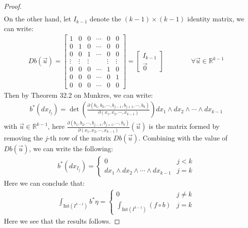 \documentclass[11pt,oneside]{book}
\theoremstyle{break}
\theoremstyle{break}
\newcommand{\R}{\mathbb{R}}
\newcommand{\Int}{\text{Int}}
\newcommand{\bmat}[1]{\begin{bmatrix} #1 \end{bmatrix}}
\begin{document}
\begin{proof}
\begin{align*}
\end{align*}
On the other hand, let $I_{k-1}$ denote the $(k-1)\times (k-1)$ identity matrix, we can write:
\begin{align*}
Db(\vec{u}) =\bmat{1&0&0 & \cdots & 0& 0\\
0&1&0 & \cdots & 0& 0\\
0&0&1 & \cdots & 0& 0\\
\vdots&\vdots&\vdots & & \vdots& \vdots\\
0&0&0 & \cdots & 1& 0\\
0&0&0 & \cdots & 0& 1\\
0&0&0 & \cdots & 0& 0}= \bmat{I_{k-1} \\ \vec{0}} \qquad\qquad \forall \vec{u}\in \R^{k-1}
\end{align*}
Then by Theorem 32.2 on Munkres, we can write:
\begin{align*}
b^*(dx_{I_j}) = \det\left(\frac{\partial (b_1, b_2,\cdots, b_{j-1}, b_{j+1}, \cdots, b_k)}{\partial (x_1,x_2,\cdots, x_{k-1})}\right) dx_1 \wedge dx_2 \wedge \cdots \wedge dx_{k-1}
\end{align*}
with $\vec{u}\in \R^{k-1}$, here $\frac{\partial (b_1, b_2,\cdots, b_{j-1}, b_{j+1}, \cdots, b_k)}{\partial (x_1,x_2,\cdots, x_{k-1})} (\vec{u})$ is the matrix formed by removing the $j$-th row of the matrix $Db(\vec{u})$. Combining with the value of $Db(\vec{u})$, we can write the following:
\begin{align*}
b^*(dx_{I_j}) = \begin{cases}
0 & j<k \\
dx_1 \wedge dx_2 \wedge \cdots \wedge dx_{k-1} & j=k
\end{cases}
\end{align*}
Here we can conclude that:
\begin{align*}
\int_{\Int(I^{k-1})} b^*\eta = \begin{cases}
0 & j\neq k\\
\int_{\Int(I^{k-1})}(f\circ b) & j=k
\end{cases}
\end{align*}
Here we see that the results follows.
\end{proof}
\end{document}

